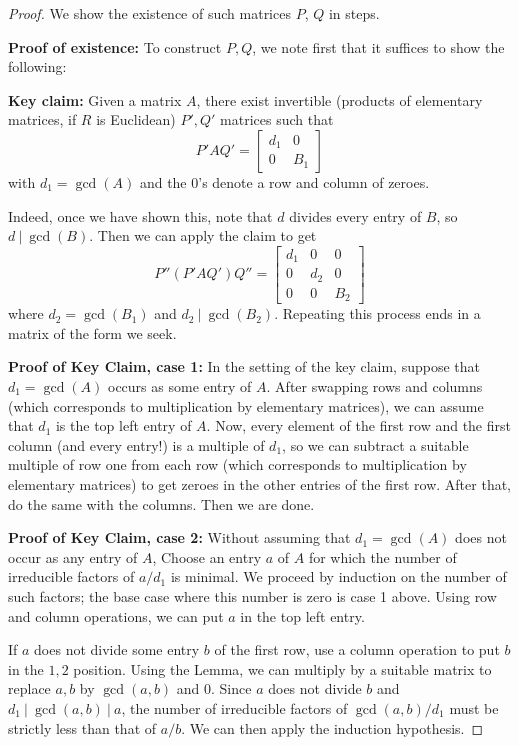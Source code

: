 \documentclass[12pt]{report}
\numberwithin{equation}{section}
\numberwithin{theorem}{chapter}
\theoremstyle{definition}
\newtheorem*{basic properties}{Basic Properties}
\newtheorem*{Important Remark}{Important Remark}
\begin{document}
\begin{proof}
We show the existence of such matrices $P$, $Q$ in steps.

\textbf{Proof of existence:} To construct $P,Q$, we note first that it suffices to show the following:

\textbf{Key claim:} Given a matrix $A$, there exist invertible  (products of elementary matrices, if $R$ is Euclidean) $P',Q'$ matrices such that 
\[ P' A Q' = \begin{bmatrix} d_1 & 0 \\ 0 & B_1\end{bmatrix}\]
with $d_1=\gcd(A)$ and the $0$'s denote a row and column of zeroes.

Indeed, once we have shown this, note that $d$ divides every entry of $B$, so $d \ | \ \gcd(B)$. Then we can apply the claim to get
\[ P'' (P' A Q') Q'' =  \begin{bmatrix} d_1 & 0 & 0 \\ 0 & d_2 & 0 \\ 0 & 0 & B_2 \end{bmatrix}\]
where $d_2= \gcd(B_1)$ and $d_2 \ | \ \gcd(B_2)$. Repeating this process ends in a matrix of the form we seek.

\textbf{Proof of Key Claim, case 1:} In the setting of the key claim, suppose that $d_1= \gcd(A)$ occurs as some entry of $A$. After swapping rows and columns (which corresponds to multiplication by elementary matrices), we can assume that $d_1$ is the top left entry of $A$. Now, every element of the first row and the first column (and every entry!) is a multiple of $d_1$, so we can subtract a suitable multiple of row one from each row (which corresponds to multiplication by elementary matrices) to get zeroes in the other entries of the first row. After that, do the same with the columns. Then we are done.

\textbf{Proof of Key Claim, case 2:} Without assuming that $d_1=\gcd(A)$ does not occur as any entry of $A$, Choose an entry $a$ of $A$ for which the number of irreducible factors of $a/d_1$ is minimal. We proceed by induction on the number of such factors; the base case where this number is zero is case 1 above. Using row and column operations, we can put $a$ in the top left entry. 

If $a$ does not divide some entry $b$ of the first row, use a column operation to put $b$ in the $1,2$ position. Using the Lemma, we can multiply by a suitable matrix to replace $a,b$ by $\gcd(a,b)$ and $0$. Since $a$ does not divide $b$ and $d_1 \ | \ \gcd(a,b) \ | \ a$, the number of irreducible factors of $\gcd(a,b)/d_1$ must be strictly less than that of $a/b$. We can then apply the induction hypothesis. 


\end{proof}
\end{document}
